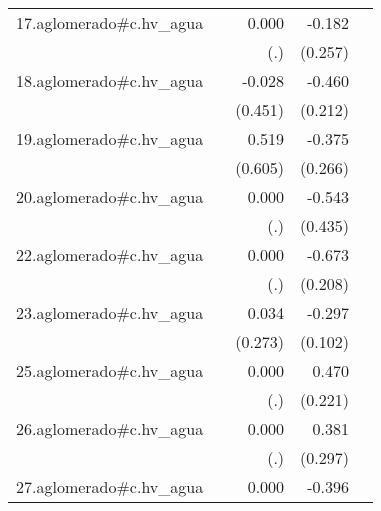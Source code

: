 {\begin{longtable}{l*{4}{D{.}{.}{-1}}}
\addlinespace
17.aglomerado#c.hv\_agua&                     &       0.000         &      -0.182         &                     \\
            &                     &         (.)         &     (0.257)         &                     \\
\addlinespace
18.aglomerado#c.hv\_agua&                     &      -0.028         &      -0.460\sym{*}  &                     \\
            &                     &     (0.451)         &     (0.212)         &                     \\
\addlinespace
19.aglomerado#c.hv\_agua&                     &       0.519         &      -0.375         &                     \\
            &                     &     (0.605)         &     (0.266)         &                     \\
\addlinespace
20.aglomerado#c.hv\_agua&                     &       0.000         &      -0.543         &                     \\
            &                     &         (.)         &     (0.435)         &                     \\
\addlinespace
22.aglomerado#c.hv\_agua&                     &       0.000         &      -0.673\sym{**} &                     \\
            &                     &         (.)         &     (0.208)         &                     \\
\addlinespace
23.aglomerado#c.hv\_agua&                     &       0.034         &      -0.297\sym{**} &                     \\
            &                     &     (0.273)         &     (0.102)         &                     \\
\addlinespace
25.aglomerado#c.hv\_agua&                     &       0.000         &       0.470\sym{*}  &                     \\
            &                     &         (.)         &     (0.221)         &                     \\
\addlinespace
26.aglomerado#c.hv\_agua&                     &       0.000         &       0.381         &                     \\
            &                     &         (.)         &     (0.297)         &                     \\
\addlinespace
27.aglomerado#c.hv\_agua&                     &       0.000         &      -0.396         &                     \\

\end{longtable}}

